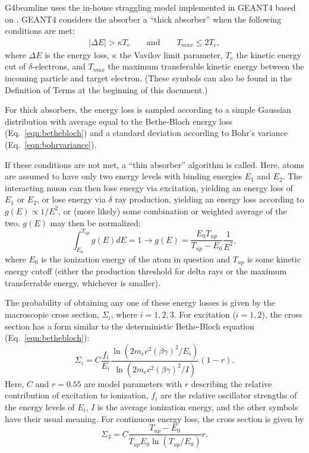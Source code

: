  \label{sec:g4blstraggling}

G4beamline uses the in-house straggling model implemented in GEANT4 based on \cite{geant4}.  GEANT4 considers the absorber a ``thick absorber'' when the following conditions are met:
\begin{align}\label{eqn:G4StragglingThickTest}
|\Delta E| > \kappa T_c \qquad \text{and} \qquad T_{max} \le 2T_c,
\end{align}
where $\Delta E$ is the energy loss, $\kappa$ the Vavilov limit parameter, $T_c$ the kinetic energy cut of $\delta$-electrons, and $T_{max}$ the maximum transferable kinetic energy between the incoming particle and target electron. (These symbols can also be found in the Definition of Terms at the beginning of this document.)

For thick absorbers, the energy loss is sampled according to a simple Gaussian distribution with average equal to the Bethe-Bloch energy loss (Eq.~\eqref{eqn:bethebloch}) and a standard deviation according to Bohr's variance (Eq.~\eqref{eqn:bohrvariance}).

If these conditions are not met, a ``thin absorber'' algorithm is called. Here, atoms are assumed to have only two energy levels with binding energies $E_1$ and $E_2$. The interacting muon can then lose energy via excitation, yielding an energy loss of $E_1$ or $E_2$, or lose energy via $\delta$ ray production, yielding an energy loss according to $ g(E) \propto 1/E^2 $, or (more likely) some combination or weighted average of the two. $g(E)$ may then be normalized:
\begin{equation}
\int_{E_0}^{T_{up}} g(E) dE = 1 \rightarrow g(E)=\frac{E_0 T_{up}}{T_{up}-E_0}\frac{1}{E^2},
\label{eqn:G4StragglingIonization}
\end{equation}
where $E_0$ is the ionization energy of the atom in question and $T_{up}$ is some kinetic energy cutoff (either the production threshold for delta rays or the maximum transferrable energy, whichever is smaller).

The probability of obtaining any one of these energy losses is given by the macroscopic cross section, $\Sigma_i$, where $i=1,2,3$. For excitation ($i=1,2$), the cross section has a form similar to the deterministic Bethe-Bloch equation (Eq.~\eqref{eqn:bethebloch}):
\begin{equation}\label{eqn:G4StragglingCrossSectionExcitation}
\Sigma_i=C\frac{f_i}{E_i}\frac{\ln(2m_e c^2(\beta\gamma)^2/E_i)}{\ln(2m_e c^2(\beta\gamma)^2/I)}(1-r).
\end{equation}
Here, $C$ and $r=0.55$ are model parameters with $r$ describing the relative contribution of excitation to ionization, $f_i$ are the relative oscillator strengths of the energy levels of $E_i$, $I$ is the average ionization energy, and the other symbols have their usual meaning. For continuous energy loss, the cross section is given by
\begin{equation}\label{eqn:G4StragglingCrossSectionIonization}
\Sigma_3=C\frac{T_{up}-E_0}{T_{up}E_0\ln(T_{up}/E_0)}r.
\end{equation}

